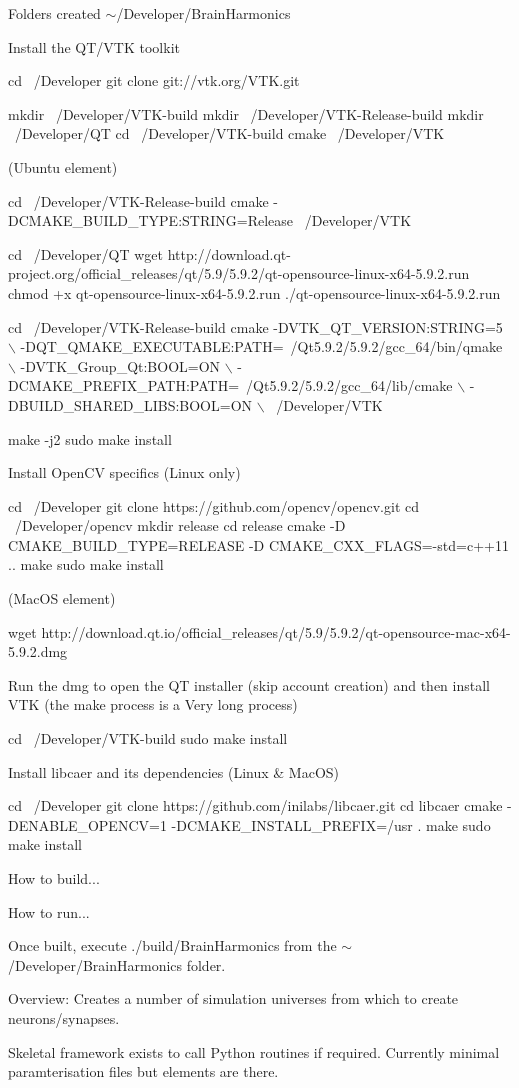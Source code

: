 Folders created $\sim$/\+Developer/\+Brain\+Harmonics

Install the Q\+T/\+V\+TK toolkit


\begin{DoxyCode}
cd ~/Developer
git clone git://vtk.org/VTK.git

mkdir ~/Developer/VTK-build
mkdir ~/Developer/VTK-Release-build
mkdir ~/Developer/QT
cd ~/Developer/VTK-build
cmake ~/Developer/VTK
\end{DoxyCode}
 (Ubuntu element) 
\begin{DoxyCode}
cd ~/Developer/VTK-Release-build
cmake -DCMAKE\_BUILD\_TYPE:STRING=Release ~/Developer/VTK

cd ~/Developer/QT
wget http://download.qt-project.org/official\_releases/qt/5.9/5.9.2/qt-opensource-linux-x64-5.9.2.run
chmod +x qt-opensource-linux-x64-5.9.2.run
./qt-opensource-linux-x64-5.9.2.run

cd ~/Developer/VTK-Release-build
cmake -DVTK\_QT\_VERSION:STRING=5 \(\backslash\)
      -DQT\_QMAKE\_EXECUTABLE:PATH=~/Qt5.9.2/5.9.2/gcc\_64/bin/qmake \(\backslash\)
      -DVTK\_Group\_Qt:BOOL=ON \(\backslash\)
      -DCMAKE\_PREFIX\_PATH:PATH=~/Qt5.9.2/5.9.2/gcc\_64/lib/cmake  \(\backslash\)
      -DBUILD\_SHARED\_LIBS:BOOL=ON \(\backslash\)
      ~/Developer/VTK

make -j2
sudo make install
\end{DoxyCode}


Install Open\+CV specifics (Linux only) 
\begin{DoxyCode}
cd ~/Developer
git clone https://github.com/opencv/opencv.git
cd ~/Developer/opencv
mkdir release
cd release
cmake -D CMAKE\_BUILD\_TYPE=RELEASE -D CMAKE\_CXX\_FLAGS=-std=c++11 ..
make
sudo make install
\end{DoxyCode}


(Mac\+OS element) 
\begin{DoxyCode}
wget http://download.qt.io/official\_releases/qt/5.9/5.9.2/qt-opensource-mac-x64-5.9.2.dmg
\end{DoxyCode}
 Run the dmg to open the QT installer (skip account creation) and then install V\+TK (the make process is a Very long process) 
\begin{DoxyCode}
cd ~/Developer/VTK-build
sudo make install
\end{DoxyCode}


Install libcaer and its dependencies (Linux \& Mac\+OS)


\begin{DoxyCode}
cd ~/Developer
git clone https://github.com/inilabs/libcaer.git
cd libcaer
cmake -DENABLE\_OPENCV=1 -DCMAKE\_INSTALL\_PREFIX=/usr .
make
sudo make install
\end{DoxyCode}


How to build...

How to run...

Once built, execute ./build/\+Brain\+Harmonics from the $\sim$/\+Developer/\+Brain\+Harmonics folder.

Overview\+: Creates a number of simulation universes from which to create neurons/synapses.

Skeletal framework exists to call Python routines if required. Currently minimal paramterisation files but elements are there. 